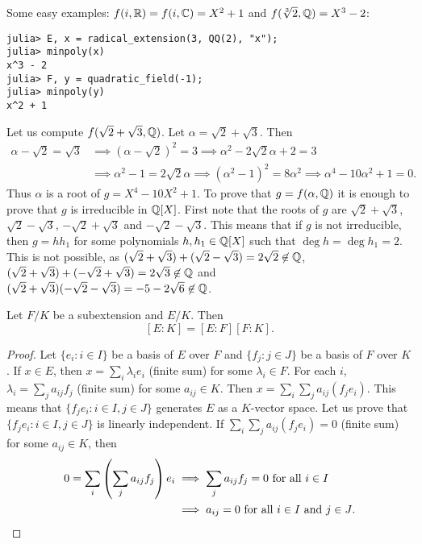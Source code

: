 Some easy examples: $f(i,\mathbb{R})=f(i,\mathbb{C})=X^2+1$ and 
$f(\sqrt[3]{2},\mathbb{Q})=X^3-2$:
\begin{lstlisting}
julia> E, x = radical_extension(3, QQ(2), "x");
julia> minpoly(x)
x^3 - 2
julia> F, y = quadratic_field(-1);
julia> minpoly(y)
x^2 + 1
\end{lstlisting}

\begin{example}
	Let us compute 
	$f(\sqrt{2}+\sqrt{3},\mathbb{Q})$. Let $\alpha=\sqrt{2}+\sqrt{3}$. 
	Then 
	\begin{align*}
		\alpha-\sqrt{2}=\sqrt{3} & \implies 
		(\alpha-\sqrt{2})^2=3 \implies \alpha^2-2\sqrt{2}\alpha+2=3\\
		&\implies \alpha^2-1=2\sqrt{2}\alpha \implies
		(\alpha^2-1)^2=8\alpha^2\implies
		\alpha^4-10\alpha^2+1=0.
	\end{align*}
	Thus $\alpha$ is a root of $g=X^4-10X^2+1$. To prove that $g=f(\alpha,\mathbb{Q})$ 
	it is enough to prove that 
	$g$ is irreducible in $\mathbb{Q}[X]$. First note that 
	the roots
	of $g$ are $\sqrt{2}+\sqrt{3}$, $\sqrt{2}-\sqrt{3}$, 
	$-\sqrt{2}+\sqrt{3}$ and $-\sqrt{2}-\sqrt{3}$. This means that
	if $g$ is not irreducible, 
	then $g=hh_1$ for some polynomials $h,h_1\in\mathbb{Q}[X]$ such that
	$\deg h=\deg h_1=2$. This is not possible, as 
	$(\sqrt{2}+\sqrt{3})+(\sqrt{2}-\sqrt{3})=2\sqrt{2}\not\in\mathbb{Q}$, 
	$(\sqrt{2}+\sqrt{3})+(-\sqrt{2}+\sqrt{3})=2\sqrt{3}\not\in\mathbb{Q}$ and 
	$(\sqrt{2}+\sqrt{3})(-\sqrt{2}-\sqrt{3})=-5-2\sqrt{6}\not\in\mathbb{Q}$.
\end{example}


\begin{proposition}
	Let $F/K$ be a subextension and $E/K$. Then
	\[
	[E:K]=[E:F][F:K].
	\]
\end{proposition}

\begin{proof}
	Let $\{e_i:i\in I\}$ be a basis of $E$ over $F$
	and $\{f_j:j\in J\}$ be a basis of $F$ over $K$. If $x\in E$,
	then $x=\sum_i \lambda_ie_i$ (finite sum) 
	for some $\lambda_i\in F$. For each $i$, 
	$\lambda_i=\sum_j a_{ij}f_j$ (finite sum)
	for some $a_{ij}\in K$. Then 
	$x=\sum_i\sum_j a_{ij}(f_je_i)$. This means
	that $\{f_je_i:i\in I,j\in J\}$ generates
	$E$ as a $K$-vector space. Let us prove that 
	$\{f_je_i:i\in I,j\in J\}$
	is linearly independent. If $\sum_i\sum_j a_{ij}(f_je_i)=0$ (finite sum)
	for some $a_{ij}\in K$, 
	then
	\begin{align*}
		0=\sum_i\left(\sum_j a_{ij}f_j\right)e_i&\implies
		\sum_j a_{ij}f_j=0\text{ for all $i\in I$}\\
		&\implies 
		a_{ij}=0\text{ for all $i\in I$ and $j\in J$}.\qedhere
	\end{align*}
\end{proof}

